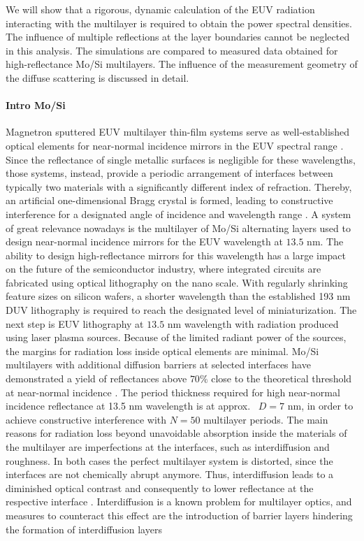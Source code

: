 We will show that a rigorous, dynamic calculation of the EUV radiation interacting with the multilayer is required to obtain the power spectral densities. The influence of multiple reflections at the layer boundaries cannot be neglected in this analysis. The simulations are compared to measured data obtained for high-reflectance Mo/Si multilayers. The influence of the measurement geometry of the diffuse scattering is discussed in detail.

\paragraph{Intro Mo/Si}
Magnetron sputtered EUV multilayer thin-film systems serve as well-established optical elements for near-normal incidence mirrors in the EUV spectral range \cite{martinez-galarce_high_2000,barbee_multi-spectral_1991,toyoda_soft-x-ray_2000,finkenthal_near_1990}. Since the reflectance of single metallic surfaces is negligible for these wavelengths, those systems, instead, provide a periodic arrangement of interfaces between typically two materials with a significantly different index of refraction. Thereby, an artificial one-dimensional Bragg crystal is formed, leading to constructive interference for a designated angle of incidence and wavelength range \cite{spiller_low-loss_1972}. A system of great relevance nowadays is the multilayer of Mo/Si alternating layers used to design near-normal incidence mirrors for the EUV wavelength at $13.5$ nm. The ability to design high-reflectance mirrors for this wavelength has a large impact on the future of the semiconductor industry, where integrated circuits are fabricated using optical lithography on the nano scale. With regularly shrinking feature sizes on silicon wafers, a shorter wavelength than the established 193 nm DUV lithography is required to reach the designated level of miniaturization. The next step is EUV lithography at $13.5$ nm wavelength with radiation produced using laser plasma sources. Because of the limited radiant power of the sources, the margins for radiation loss inside optical elements are minimal. Mo/Si multilayers with additional diffusion barriers at selected interfaces have demonstrated a yield of reflectances above $70\%$ close to the theoretical threshold at near-normal incidence \cite{barbee_molybdenum-silicon_1985,stearns_fabrication_1991,bajt_improved_2002,braun_grenzflachen-optimierte_2003}. The period thickness required for high near-normal incidence reflectance at 13.5 nm wavelength is at approx.~ $D=7$ nm, in order to achieve constructive interference with $N=50$ multilayer periods. The main reasons for radiation loss beyond unavoidable absorption inside the materials of the multilayer are imperfections at the interfaces, such as interdiffusion and roughness. In both cases the perfect multilayer system is distorted, since the interfaces are not chemically abrupt anymore. Thus, interdiffusion leads to a diminished optical contrast and consequently to lower reflectance at the respective interface \cite{nakajima_interdiffusion_1988}. Interdiffusion is a known problem for multilayer optics, and measures to counteract this effect are the introduction of barrier layers hindering the formation of interdiffusion layers 